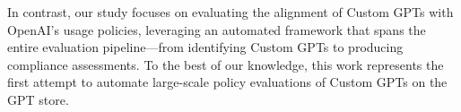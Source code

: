 In contrast, our study focuses on evaluating the alignment of Custom GPTs with OpenAI’s usage policies, leveraging an automated framework that spans the entire evaluation pipeline—from identifying Custom GPTs to producing compliance assessments. To the best of our knowledge, this work represents the first attempt to automate large-scale policy evaluations of Custom GPTs on the GPT store.

